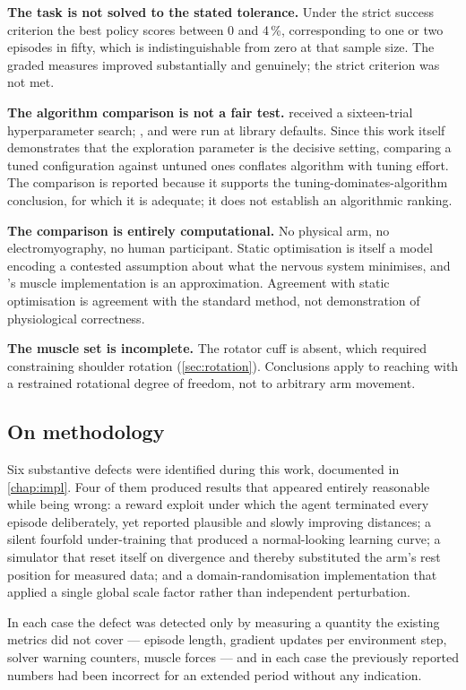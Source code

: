 \textbf{The task is not solved to the stated tolerance.} Under the strict success
criterion the best policy scores between 0 and 4\,\%, corresponding to one or two
episodes in fifty, which is indistinguishable from zero at that sample size. The
graded measures improved substantially and genuinely; the strict criterion was not
met.

\textbf{The algorithm comparison is not a fair test.} \SAC received a
sixteen-trial hyperparameter search; \TDIII, \DDPG and \PPO were run at library
defaults. Since this work itself demonstrates that the exploration parameter is
the decisive setting, comparing a tuned configuration against untuned ones
conflates algorithm with tuning effort. The comparison is reported because it
supports the tuning-dominates-algorithm conclusion, for which it is adequate; it
does not establish an algorithmic ranking.

\textbf{The comparison is entirely computational.} No physical arm, no
electromyography, no human participant. Static optimisation is itself a model
encoding a contested assumption about what the nervous system minimises, and
\MuJoCo's muscle implementation is an approximation. Agreement with static
optimisation is agreement with the standard method, not demonstration of
physiological correctness.

\textbf{The muscle set is incomplete.} The rotator cuff is absent, which required
constraining shoulder rotation (\cref{sec:rotation}). Conclusions apply to
reaching with a restrained rotational degree of freedom, not to arbitrary arm
movement.

\subsection{On methodology}

Six substantive defects were identified during this work, documented in
\cref{chap:impl}. Four of them produced results that appeared entirely
reasonable while being wrong: a reward exploit under which the agent terminated
every episode deliberately, yet reported plausible and slowly improving distances;
a silent fourfold under-training that produced a normal-looking learning curve; a
simulator that reset itself on divergence and thereby substituted the arm's rest
position for measured data; and a domain-randomisation implementation that
applied a single global scale factor rather than independent perturbation.

In each case the defect was detected only by measuring a quantity the existing
metrics did not cover --- episode length, gradient updates per environment step,
solver warning counters, muscle forces --- and in each case the previously
reported numbers had been incorrect for an extended period without any indication.

